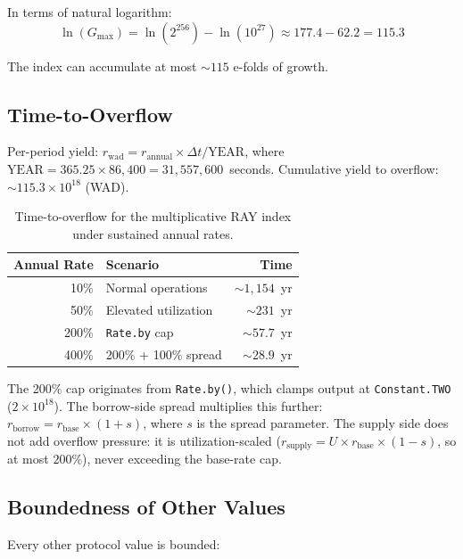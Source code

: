 \documentclass[10pt,a4paper,twocolumn]{article}
\begin{document}
In terms of natural logarithm:
\begin{equation}
\label{eq:efolds}
\ln(G_{\max}) = \ln(2^{256}) - \ln(10^{27}) \approx 177.4 - 62.2 = 115.3
\end{equation}

The index can accumulate at most ${\sim}115$ e-folds of growth.

\subsection{Time-to-Overflow}
\label{subsec:time-to-overflow}

Per-period yield: $r_{\text{wad}} = r_{\text{annual}} \times \Delta t / \text{YEAR}$, where $\text{YEAR} = 365.25 \times 86{,}400 = 31{,}557{,}600$~seconds. Cumulative yield to overflow: ${\sim}115.3 \times 10^{18}$ (WAD).

\begin{table}[htbp]
\centering
\caption{Time-to-overflow for the multiplicative RAY index under sustained annual rates.}
\label{tab:overflow}
\small
\begin{tabular*}{0.95\columnwidth}{@{\extracolsep{\fill}}rlr@{}}
\toprule
Annual Rate & Scenario & Time \\
\midrule
10\% & Normal operations & ${\sim}1{,}154$~yr \\
50\% & Elevated utilization & ${\sim}231$~yr \\
200\% & \texttt{Rate.by} cap & ${\sim}57.7$~yr \\
400\% & 200\% + 100\% spread & ${\sim}28.9$~yr \\
\bottomrule
\end{tabular*}
\end{table}

The 200\% cap originates from \texttt{Rate.by()}, which clamps output at \texttt{Constant.TWO} ($2 \times 10^{18}$). The borrow-side spread multiplies this further: $r_{\text{borrow}} = r_{\text{base}} \times (1 + s)$, where $s$ is the spread parameter. The supply side does not add overflow pressure: it is utilization-scaled ($r_{\text{supply}} = U \times r_{\text{base}} \times (1 - s)$, so at most $200\%$), never exceeding the base-rate cap.

\subsection{Boundedness of Other Values}
\label{subsec:bounded}

Every other protocol value is bounded:
\end{document}
